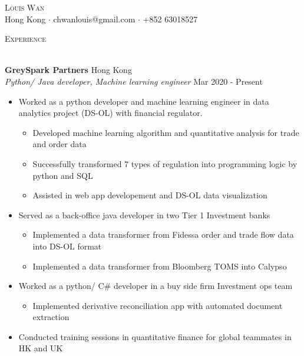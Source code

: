 \documentclass[a4paper]{article}
\newcommand{\lineunder} {
    \vspace*{-8pt} \\
    \hspace*{-18pt} \hrulefill \\
}
\newcommand{\header} [1] {
    {\hspace*{-18pt}\vspace*{6pt} \textsc{#1}}
    \vspace*{-6pt} \lineunder
}
\begin{document}
\vspace*{-40pt}

    

\vspace*{-10pt}
\begin{center}
    {\Huge \scshape {Louis Wan}}\\
    Hong Kong $\cdot$ chwanlouis@gmail.com $\cdot$ +852 63018527\\
\end{center}

\header{Experience}
\vspace{1mm}

\textbf{GreySpark Partners} \hfill Hong Kong\\
\textit{Python/ Java developer, Machine learning engineer} \hfill Mar 2020 - Present\\
\vspace{-1mm}
\begin{itemize} \itemsep 1pt
    \item Worked as a python developer and machine learning engineer in data analytics project (DS-OL) with financial regulator.
        \begin{itemize}
            \item Developed machine learning algorithm and quantitative analysis for trade and order data
            \item Successfully transformed 7 types of regulation into programming logic by python and SQL
            \item Assisted in web app developement and DS-OL data visualization
        \end{itemize}
    \item Served as a back-office java developer in two Tier 1 Investment banks
        \begin{itemize}
            \item Implemented a data transformer from Fidessa order and trade flow data into DS-OL format
            \item Implemented a data transformer from Bloomberg TOMS into Calypso
        \end{itemize}
    \item Worked as a python/ C\# developer in a buy side firm Investment ops team
        \begin{itemize}
            \item Implemented derivative reconciliation app with automated document extraction
        \end{itemize}
    \item Conducted training sessions in quantitative finance for global teammates in HK and UK
\end{itemize}
\end{document}
